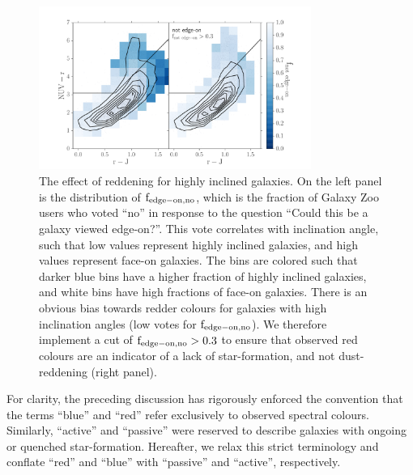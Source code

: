 \documentclass[useAMS,usenatbib]{mn2e}
\begin{document}
\begin{figure}
\centering
\includegraphics[width=3.5in,trim={1cm 0cm 1cm 1cm},clip]{figures/edgeon_colorcolor.pdf}
\caption{The effect of reddening for highly inclined galaxies. On the left panel is the distribution of $\rm f_{edge-on,no}$, which is the fraction of Galaxy Zoo users who voted ``no'' in response to the question ``Could this be a galaxy viewed edge-on?''. This vote correlates with inclination angle, such that low values represent highly inclined galaxies, and high values represent face-on galaxies. The bins are colored such that darker blue bins have a higher fraction of highly inclined galaxies, and white bins have high fractions of face-on galaxies. There is an obvious bias towards redder colours for galaxies with high inclination angles (low votes for $\rm f_{edge-on,no}$). We therefore implement a cut of $\rm f_{edge-on,no}>0.3$ to ensure that observed red colours are an indicator of a lack of star-formation, and not dust-reddening (right panel). }
\label{fig:edgeon}
\end{figure}

For clarity, the preceding discussion has rigorously enforced the convention that the terms ``blue'' and ``red'' refer exclusively to observed spectral colours. Similarly, ``active'' and ``passive'' were reserved to describe galaxies with ongoing or quenched star-formation. Hereafter, we relax this strict terminology and conflate ``red'' and ``blue'' with ``passive'' and ``active'', respectively.
\end{document}
